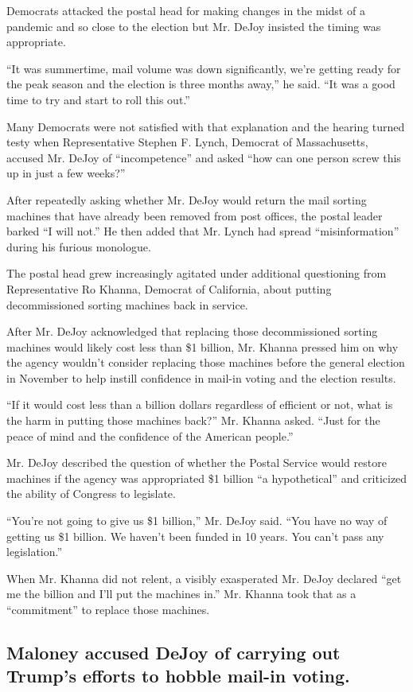 Democrats attacked the postal head for making changes in the midst of a
pandemic and so close to the election but Mr. DeJoy insisted the timing
was appropriate.

``It was summertime, mail volume was down significantly, we're getting
ready for the peak season and the election is three months away,'' he
said. ``It was a good time to try and start to roll this out.''

Many Democrats were not satisfied with that explanation and the hearing
turned testy when Representative Stephen F. Lynch, Democrat of
Massachusetts, accused Mr. DeJoy of ``incompetence'' and asked ``how can
one person screw this up in just a few weeks?''

After repeatedly asking whether Mr. DeJoy would return the mail sorting
machines that have already been removed from post offices, the postal
leader barked ``I will not.'' He then added that Mr. Lynch had spread
``misinformation'' during his furious monologue.

The postal head grew increasingly agitated under additional questioning
from Representative Ro Khanna, Democrat of California, about putting
decommissioned sorting machines back in service.

After Mr. DeJoy acknowledged that replacing those decommissioned sorting
machines would likely cost less than \$1 billion, Mr. Khanna pressed him
on why the agency wouldn't consider replacing those machines before the
general election in November to help instill confidence in mail-in
voting and the election results.

``If it would cost less than a billion dollars regardless of efficient
or not, what is the harm in putting those machines back?'' Mr. Khanna
asked. ``Just for the peace of mind and the confidence of the American
people.''

Mr. DeJoy described the question of whether the Postal Service would
restore machines if the agency was appropriated \$1 billion ``a
hypothetical'' and criticized the ability of Congress to legislate.

``You're not going to give us \$1 billion,'' Mr. DeJoy said. ``You have
no way of getting us \$1 billion. We haven't been funded in 10 years.
You can't pass any legislation.''

When Mr. Khanna did not relent, a visibly exasperated Mr. DeJoy declared
``get me the billion and I'll put the machines in.'' Mr. Khanna took
that as a ``commitment'' to replace those machines.

\hypertarget{maloney-accused-dejoy-of-carrying-out-trumps-efforts-to-hobble-mail-in-voting}{%
\subsection{Maloney accused DeJoy of carrying out Trump's efforts to
hobble mail-in
voting.}\label{maloney-accused-dejoy-of-carrying-out-trumps-efforts-to-hobble-mail-in-voting}}

